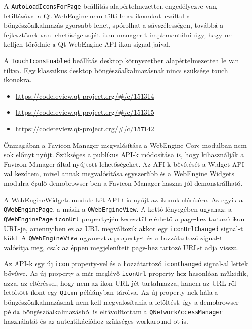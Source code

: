 \documentclass[12pt]{report}
\let\origurl\url
\renewcommand{\url}[1]{%
    \textcolor{blue}{\origurl{#1}}
}
\newcommand{\gerrit}[1]{%
    \textcolor{qtgreen}{\origurl{https://codereview.qt-project.org/\#/c/#1}}
}
\begin{document}
A \texttt{AutoLoadIconsForPage} beállítás alapértelmezetten engedélyezve van, letiltásával
a Qt WebEngine nem tölti le az ikonokat, ezáltal a böngészőalkalmazás gyorsabb lehet,
spórolhat a sávszélességen, továbbá a fejlesztőnek van lehetősége saját ikon manager-t
implementálni úgy, hogy ne kelljen törődnie a Qt WebEngine API ikon signal-jaival.

A \texttt{TouchIconsEnabled} beállítás desktop környezetben alapértelmezetten le van tiltva.
Egy klasszikus desktop böngészőalkalmazásnak nincs szüksége touch ikonokra.

\begin{center}
    \begin{reviewbox}
        \begin{itemize}
            \renewcommand{\labelitemi}{\textcolor{qtgreen}{$\blacktriangleright$}}
            \item \gerrit{151314}
            \item \gerrit{151315}
            \item \gerrit{157142}
        \end{itemize}
    \end{reviewbox}
\end{center}

Önmagában a Favicon Manager megvalósítása a WebEngine Core modulban nem sok előnyt nyújt.
Szükséges a publikus API-k módosítása is, hogy kihasználják a Favicon Manager által nyújtott
lehetőségeket. Az API-k bővítését a Widget API-val kezdtem, mivel annak megvalósítása
egyszerűbb és a WebEngine Widgets modulra épülő demobrowser-ben a Favicon Manager haszna
jól demonstrálható.

A WebEngineWidgets module két API-t is nyújt az ikonok elérésére. Az egyik a
\texttt{QWebEnginePage}, a másik a \texttt{QWebEngineView}. A kettő lényegében ugyanaz:
a \texttt{QWebEnginePage} \texttt{iconUrl} property-jén keresztül elérhető a page-hez
tartozó ikon URL-je, amennyiben ez az URL megváltozik akkor egy \texttt{iconUrlChanged}
signal-t küld. A \texttt{QWebEngineView} ugyanezt a property-t és a hozzátartozó signal-t
valósítja meg, csak az éppen megjelenített page-hez tartozó URL-t adja vissza.

Az API-k egy új \texttt{icon} property-vel és a hozzátartozó \texttt{iconChanged} signal-al
lettek bővítve. Az új property a már meglévő \texttt{iconUrl} property-hez hasonlóan működik,
azzal az eltéréssel, hogy nem az ikon URL-jét tartalmazza, hanem az URL-ről letöltött ikont
egy \texttt{QIcon} példányban tárolva. Az új property-nek hála a böngészőalkalmazásnak nem
kell megvalósítania a letöltést, így a demobrowser példa böngészőalkalmazásból is
eltávolítottam a \texttt{QNetworkAccessManager} használatát és az autentikációhoz szükséges
workaround-ot is.
\end{document}
